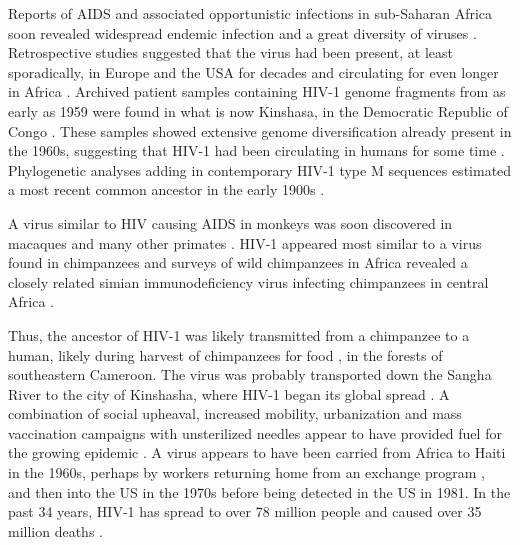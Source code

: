 \documentclass[../sherrill-Mix_thesis.tex]{subfiles}
\begin{document}
	Reports of AIDS and associated opportunistic infections in sub-Saharan Africa soon revealed widespread endemic infection \citep{Clumeck1983,Clumeck1984,VandePerre1984,Piot1984} and a great diversity of viruses \citep{Nkengasong1994,Louwagie1995,Vidal2000,Rambaut2001,Yang2001,Kalish2004}. Retrospective studies suggested that the virus had been present, at least sporadically, in Europe and the USA for decades \citep{Froland1988,Garry1988} and circulating for even longer in Africa \citep{Bygbjerg1983,Vandepitte1983,Clumeck1984,Nahmias1986,Zhu1998,Worobey2008}. Archived patient samples containing HIV-1 genome fragments from as early as 1959 were found in what is now Kinshasa, in the Democratic Republic of Congo \citep{Nahmias1986}. These samples showed extensive genome diversification already present in the 1960s, suggesting that HIV-1 had been circulating in humans for some time \citep{Zhu1998,Worobey2008}. Phylogenetic analyses adding in contemporary HIV-1 type M sequences estimated a most recent common ancestor in the early 1900s \citep{Korber2000,Salemi2001,Sharp2001,Yusim2001,Worobey2008,Faria2014}.
	
	A virus similar to HIV causing AIDS in monkeys was soon discovered in macaques \citep{Daniel1985,Peeters1989} and many other primates \citep{Peeters2001}. HIV-1 appeared most similar to a virus found in chimpanzees \citep{Peeters1989,Huet1990} and surveys of wild chimpanzees in Africa revealed a closely related simian immunodeficiency virus infecting chimpanzees in central Africa \citep{Gao1999,Keele2006,VanHeuverswyn2007}.
	
	Thus, the ancestor of HIV-1 was likely transmitted from a chimpanzee to a human, likely during harvest of chimpanzees for food \citep{Bowen-Jones1999,Hahn2000,Peeters2002,Wolfe2004,Wolfe2005,Kalish2005}, in the forests of southeastern Cameroon. The virus was probably transported down the Sangha River \citep{Sharp2008} to the city of Kinshasha, where HIV-1 began its global spread \citep{Vidal2000,Vangroenweghe2001,Worobey2008,Faria2014}. A combination of social upheaval, increased mobility, urbanization and mass vaccination campaigns with unsterilized needles appear to have provided fuel for the growing epidemic \citep{Chitnis2000,deSousa2010,deSousa2012,Faria2014}. A virus appears to have been carried from Africa to Haiti in the 1960s, perhaps by workers returning home from an exchange program \citep{Piot1984,Vangroenweghe2001}, and then into the US in the 1970s \citep{Gilbert2007} before being detected in the US in 1981. In the past 34 years, HIV-1 has spread to over 78 million people and caused over 35 million deaths \citep{UNAIDSCGA2014}.
\end{document}
